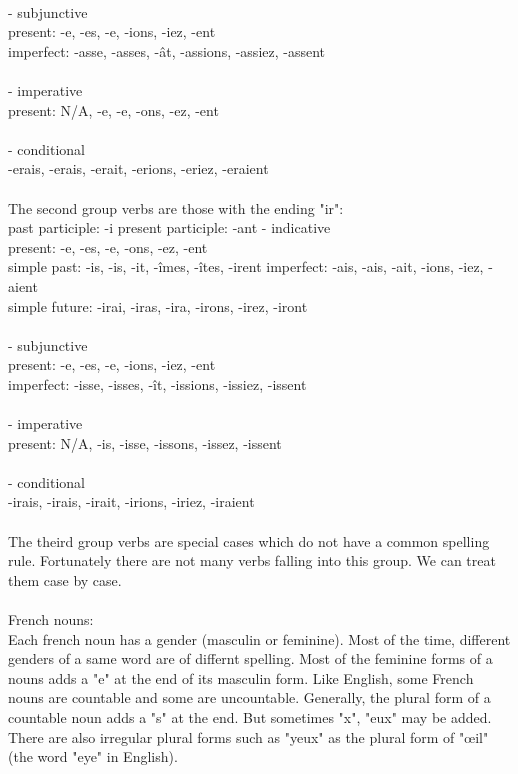 \documentclass[11pt,letterpaper]{article}
\begin{document}
\\
\indent - subjunctive\\
\indent\indent present: -e, -es, -e, -ions, -iez, -ent\\
\indent\indent imperfect: -asse, -asses, -\^at, -assions, -assiez, -assent\\
\\
\indent - imperative\\
\indent\indent present: N/A, -e, -e, -ons, -ez, -ent\\
\\
\indent - conditional\\
\indent\indent -erais, -erais, -erait, -erions, -eriez, -eraient\\
\\
\indent The second group verbs are those with the ending "ir":\\
\indent past participle: -i
\indent present participle: -ant
\indent - indicative\\
\indent\indent present: -e, -es, -e, -ons, -ez, -ent\\
\indent\indent simple past: -is, -is, -it, -\^imes, -\^ites, -irent
\indent\indent imperfect: -ais, -ais, -ait, -ions, -iez, -aient\\
\indent\indent simple future: -irai, -iras, -ira, -irons, -irez, -iront\\
\\
\indent - subjunctive\\
\indent\indent present: -e, -es, -e, -ions, -iez, -ent\\
\indent\indent imperfect: -isse, -isses, -ît, -issions, -issiez, -issent\\
\\
\indent - imperative\\
\indent\indent present: N/A, -is, -isse, -issons, -issez, -issent\\
\\
\indent - conditional\\
\indent\indent -irais, -irais, -irait, -irions, -iriez, -iraient\\
\\
\indent The theird group verbs are special cases which do not have a common spelling rule. Fortunately there are not many verbs falling into this group. We can treat them case by case.\\
\\
French nouns:\\
Each french noun has a gender (masculin or feminine). Most of the time, different genders of a same word are of differnt spelling. Most of the feminine forms of a nouns adds a "e" at the end of its masculin form. Like English, some French nouns are countable and some are uncountable. Generally, the plural form of a countable noun adds a "s" at the end. But sometimes "x", "eux" may be added. There are also irregular plural forms such as "yeux" as the plural form of "\oe il" (the word "eye" in English).\\
\end{document}
